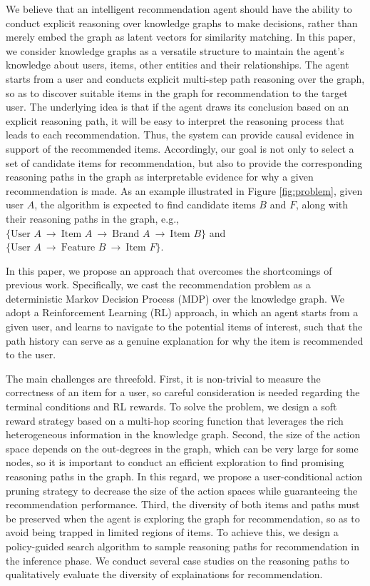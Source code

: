 \documentclass[sigconf]{acmart}
\begin{document}
We believe that an intelligent recommendation agent should have the ability to conduct explicit reasoning over knowledge graphs to make decisions, rather than merely embed the graph as latent vectors for similarity matching.
In this paper, we consider knowledge graphs as a versatile structure to maintain the agent's knowledge about users, items, other entities and their relationships. The agent starts from a user and conducts explicit multi-step path reasoning over the graph, so as to discover suitable items in the graph for recommendation to the target user.
The underlying idea is that if the agent draws its conclusion based on an explicit reasoning path, it will be easy to interpret the reasoning process that leads to each recommendation. Thus, the system can provide causal evidence in support of the recommended items. Accordingly, our goal is not only to select a set of candidate items for recommendation, but also to provide the corresponding reasoning paths in the graph as interpretable evidence for why a given recommendation is made.
As an example illustrated in Figure \ref{fig:problem}, given user $A$, the algorithm is expected to find candidate items $B$ and $F$, along with their reasoning paths in the graph, e.g., $\{\text{User }A ~\rightarrow~ \text{Item }A ~\rightarrow~ \text{Brand }A ~\rightarrow~ \text{Item }B\}$ and $\{\text{User }A ~\rightarrow~ \text{Feature }B ~\rightarrow~ \text{Item }F\}$. 






 
In this paper, we propose an approach that overcomes the shortcomings of previous work.
Specifically, we cast the recommendation problem as a deterministic Markov Decision Process (MDP) over the knowledge graph. We adopt a Reinforcement Learning (RL) approach, in which an agent starts from a given user, and learns to navigate to the potential items of interest, such that the path history can serve as a genuine explanation for why the item is recommended to the user.

The main challenges are threefold. 
First, it is non-trivial to measure the correctness of an item for a user, so careful consideration is needed regarding the terminal conditions and RL rewards. To solve the problem, we design a soft reward strategy based on a multi-hop scoring function that leverages the rich heterogeneous information in the knowledge graph.
Second, the size of the action space depends on the out-degrees in the graph, which can be very large for some nodes, so it is important to conduct an efficient exploration to find promising reasoning paths in the graph. In this regard, we propose a user-conditional action pruning strategy to decrease the size of the action spaces while guaranteeing the recommendation performance. 
Third, the diversity of both items and paths must be preserved when the agent is exploring the graph for recommendation, so as to avoid being trapped in limited regions of items. To achieve this, we design a policy-guided search algorithm to sample reasoning paths for recommendation in the inference phase. We conduct several case studies on the reasoning paths to qualitatively evaluate the diversity of explainations for recommendation.
\end{document}
